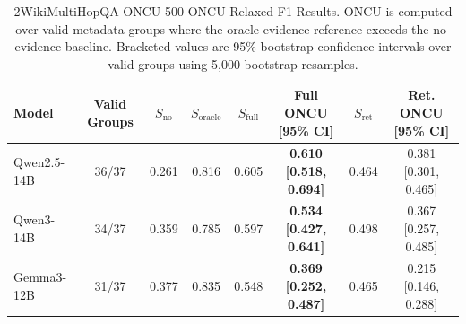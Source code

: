 \begin{table}[!t]
\renewcommand{\arraystretch}{1.12}
\caption{2WikiMultiHopQA-ONCU-500 ONCU-Relaxed-F1 Results. ONCU is computed over valid metadata groups where the oracle-evidence reference exceeds the no-evidence baseline. Bracketed values are 95\% bootstrap confidence intervals over valid groups using 5,000 bootstrap resamples.}
\label{tab:twowiki500_oncu_results}
\centering
\scriptsize
\setlength{\tabcolsep}{3pt}
\begin{tabular}{lccccccc}
\toprule
Model & Valid Groups & $S_{\mathrm{no}}$ & $S_{\mathrm{oracle}}$ & $S_{\mathrm{full}}$ & Full ONCU [95\% CI] & $S_{\mathrm{ret}}$ & Ret. ONCU [95\% CI] \\
\midrule
Qwen2.5-14B & 36/37 & 0.261 & 0.816 & 0.605 & \textbf{0.610 [0.518, 0.694]} & 0.464 & 0.381 [0.301, 0.465] \\
Qwen3-14B & 34/37 & 0.359 & 0.785 & 0.597 & \textbf{0.534 [0.427, 0.641]} & 0.498 & 0.367 [0.257, 0.485] \\
Gemma3-12B & 31/37 & 0.377 & 0.835 & 0.548 & \textbf{0.369 [0.252, 0.487]} & 0.465 & 0.215 [0.146, 0.288] \\
\bottomrule
\end{tabular}
\end{table}
